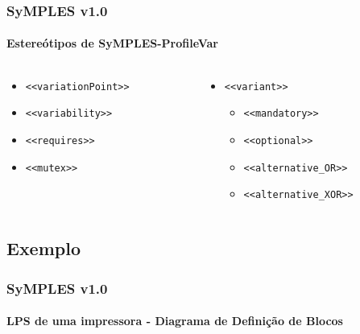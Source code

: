 \begin{frame}
\frametitle{SyMPLES v1.0}
\framesubtitle{Estereótipos de SyMPLES-ProfileVar}

\begin{columns}[onlytextwidth]
  
    \begin{column}{0.5\textwidth}
      \begin{itemize}
        \item {
          \texttt{<<variationPoint>>}
        }
        \item {
          \texttt{<<variability>>}
        }
        \item {
          \texttt{<<requires>>}
        }
        \item {
          \texttt{<<mutex>>}
        }
      \end{itemize}
    \end{column}
    
    \begin{column}{0.5\textwidth}
      \begin{itemize}
        \item {
          \texttt{<<variant>>}
          
          \begin{itemize}
            \item {
              \texttt{<<mandatory>>}
            }
            \item {
              \texttt{<<optional>>}
            }
            \item {
              \texttt{<<alternative\_OR>>}
            }
            \item {
              \texttt{<<alternative\_XOR>>}
            }
          \end{itemize}
          
        }
      \end{itemize}
    \end{column}
    
  \end{columns}

\end{frame}

\subsection{Exemplo}

\begin{frame}
\frametitle{SyMPLES v1.0}
\framesubtitle{LPS de uma impressora - Diagrama de Definição de Blocos}

  \begin{figure}
  \end{figure}

\end{frame}


